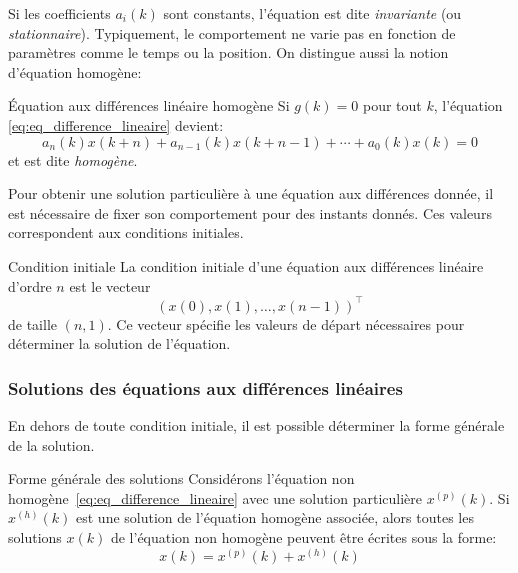             Si les coefficients $a_i(k)$ sont constants, l'équation est dite \textit{invariante} (ou \textit{stationnaire}). Typiquement, le comportement ne varie pas en fonction de paramètres comme le temps ou la position. On distingue aussi la notion d'équation homogène:
            \begin{definition}{Équation aux différences linéaire homogène}
               Si $g(k) = 0$ pour tout $k$, l'équation \ref{eq:eq_difference_lineaire} devient:
                \begin{equation}
                    a_n(k)x(k+n)+a_{n-1}(k)x(k+n-1)+\cdots+a_0(k)x(k) = 0
                \end{equation}
                et est dite \textit{homogène}.
            \end{definition}

            Pour obtenir une solution particulière à une équation aux différences donnée, il est nécessaire de fixer son comportement pour des instants donnés. Ces valeurs correspondent aux conditions initiales.
            \begin{definition}{Condition initiale}
                La condition initiale d'une équation aux différences linéaire d’ordre $n$ est le vecteur
                \begin{equation}
                    (x(0), x(1), \dots, x(n-1))^\top
                \end{equation}
                de taille $(n,1)$. Ce vecteur spécifie les valeurs de départ nécessaires pour déterminer la solution de l'équation.
            \end{definition}

            \subsubsection{Solutions des équations aux différences linéaires}
                En dehors de toute condition initiale, il est possible déterminer la forme générale de la solution.
                \begin{theorem}{Forme générale des solutions} 
                    Considérons l’équation non homogène~\eqref{eq:eq_difference_lineaire} avec une solution particulière $x^{(p)}(k)$. Si $x^{(h)}(k)$ est une solution de l’équation homogène associée, alors toutes les solutions $x(k)$ de l’équation non homogène peuvent être écrites sous la forme:
                    \begin{equation}
                        x(k) = x^{(p)}(k)+x^{(h)}(k)
                    \end{equation}
                \end{theorem}
                
